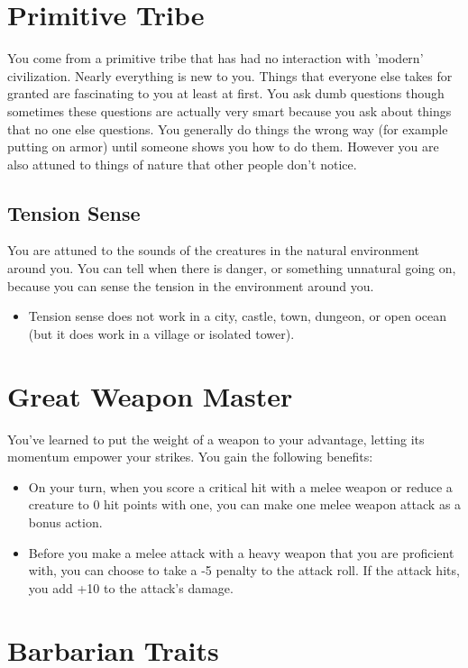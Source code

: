 {\section*{Primitive Tribe}
You come from a primitive tribe that has had no interaction with 'modern' civilization. Nearly everything is new to you. Things that everyone else takes for granted are fascinating to you at least at first. You ask dumb questions though sometimes these questions are actually very smart because you ask about things that no one else questions. You generally do things the wrong way (for example putting on armor) until someone shows you how to do them. However you are also attuned to things of nature that other people don't notice.
\subsection*{Tension Sense}
You are attuned to the sounds of the creatures in the natural environment around you. You can tell when there is danger, or something unnatural going on, because you can sense the tension in the environment around you.
\begin{itemize}
	\item Tension sense does not work in a city, castle, town, dungeon, or open ocean (but it does work in a village or isolated tower).
\end{itemize}

\section*{Great Weapon Master}
You've learned to put the weight of a weapon to your advantage, letting its momentum empower your strikes. You gain the following benefits:

\begin{itemize}
	\item On your turn, when you score a critical hit with a melee weapon or reduce a creature to 0 hit points with one, you can make one melee weapon attack as a bonus action.
	\item Before you make a melee attack with a heavy weapon that you are proficient with, you can choose to take a -5 penalty to the attack roll. If the attack hits, you add +10 to the attack's damage.
\end{itemize}

\section*{Barbarian Traits}
}
